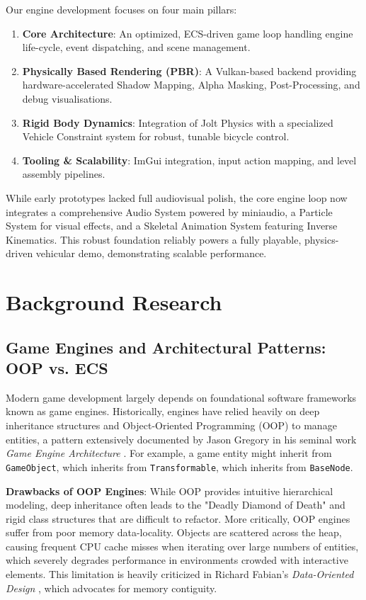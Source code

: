 \documentclass[acmtog, nonacm]{acmart}
\begin{document}
Our engine development focuses on four main pillars:
\begin{enumerate}
    \item \textbf{Core Architecture}: An optimized, ECS-driven game loop handling engine life-cycle, event dispatching, and scene management.
    \item \textbf{Physically Based Rendering (PBR)}: A Vulkan-based backend providing hardware-accelerated Shadow Mapping, Alpha Masking, Post-Processing, and debug visualisations.
    \item \textbf{Rigid Body Dynamics}: Integration of Jolt Physics with a specialized Vehicle Constraint system for robust, tunable bicycle control.
    \item \textbf{Tooling \& Scalability}: ImGui integration, input action mapping, and level assembly pipelines.
\end{enumerate}

While early prototypes lacked full audiovisual polish, the core engine loop now integrates a comprehensive Audio System powered by miniaudio, a Particle System for visual effects, and a Skeletal Animation System featuring Inverse Kinematics. This robust foundation reliably powers a fully playable, physics-driven vehicular demo, demonstrating scalable performance.

\section{Background Research}
\label{sec:background}

\subsection{Game Engines and Architectural Patterns: OOP vs. ECS}
Modern game development largely depends on foundational software frameworks known as game engines. Historically, engines have relied heavily on deep inheritance structures and Object-Oriented Programming (OOP) to manage entities, a pattern extensively documented by Jason Gregory in his seminal work \textit{Game Engine Architecture} \cite{GameEngineArch}. For example, a game entity might inherit from \texttt{GameObject}, which inherits from \texttt{Transformable}, which inherits from \texttt{BaseNode}.

\textbf{Drawbacks of OOP Engines}: While OOP provides intuitive hierarchical modeling, deep inheritance often leads to the "Deadly Diamond of Death" and rigid class structures that are difficult to refactor. More critically, OOP engines suffer from poor memory data-locality. Objects are scattered across the heap, causing frequent CPU cache misses when iterating over large numbers of entities, which severely degrades performance in environments crowded with interactive elements. This limitation is heavily criticized in Richard Fabian's \textit{Data-Oriented Design} \cite{DataOrientedDesign}, which advocates for memory contiguity.
\end{document}
